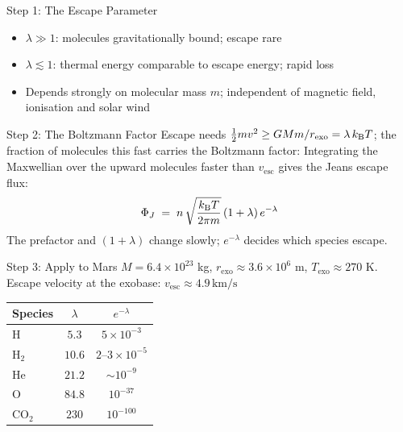 \documentclass[aspectratio=169, 11pt]{beamer}
\begin{document}
\begin{frame}{Step 1: The Escape Parameter}
  \vskip6pt
  \begin{itemize}
    \item $\lambda \gg 1$: molecules gravitationally bound; escape rare
    \item $\lambda \lesssim 1$: thermal energy comparable to escape energy; rapid loss
    \item Depends strongly on molecular mass $m$; independent of magnetic field, ionisation and solar wind
  \end{itemize}
\end{frame}

\begin{frame}{Step 2: The Boltzmann Factor}
  Escape needs $\tfrac{1}{2} m v^2 \geq G M m / r_{\mathrm{exo}} = \lambda\,k_{\mathrm{B}} T$; the fraction of molecules this fast carries the Boltzmann factor:
  \vskip4pt
  Integrating the Maxwellian over the upward molecules faster than $v_{\mathrm{esc}}$ gives the Jeans escape flux:
  $$\Phi_J \;=\; n\,\sqrt{\frac{k_{\mathrm{B}} T}{2\pi m}}\,(1+\lambda)\,e^{-\lambda}$$
  The prefactor and $(1+\lambda)$ change slowly; $e^{-\lambda}$ decides which species escape.
\end{frame}

\begin{frame}
\end{frame}

\begin{frame}{Step 3: Apply to Mars}
  $M = 6.4\times 10^{23}$ kg, $r_{\mathrm{exo}} \approx 3.6\times 10^6$ m, $T_{\mathrm{exo}} \approx 270$ K.
  \vskip2pt
  Escape velocity at the exobase: $v_{\mathrm{esc}} \approx 4.9\,\mathrm{km/s}$
  \vskip4pt
  \centering
  \small
  \begin{tabular}{l c c}
    \toprule
    \textbf{Species} & $\lambda$ & $e^{-\lambda}$ \\
    \midrule
    H & $5.3$ & $5\times 10^{-3}$ \\
    $\mathrm{H_2}$ & $10.6$ & $2$--$3\times 10^{-5}$ \\
    He & $21.2$ & $\sim 10^{-9}$ \\
    O & $84.8$ & $10^{-37}$ \\
    $\mathrm{CO_2}$ & $230$ & $10^{-100}$ \\
    \bottomrule
  \end{tabular}
  \vskip4pt
\end{frame}
\end{document}
